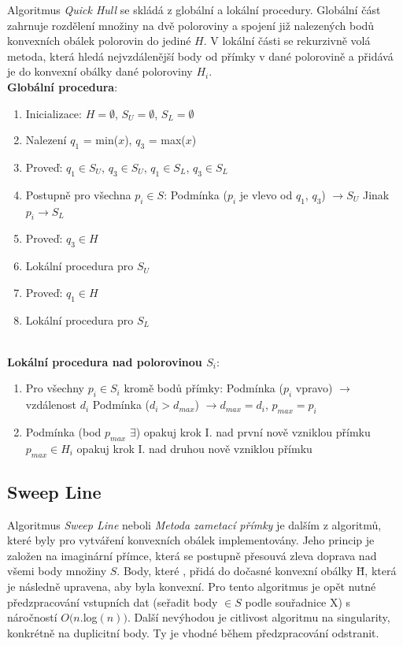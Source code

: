 \documentclass[a4paper, 12pt]{article}
\begin{document}
Algoritmus \textit{Quick Hull} se skládá z globální a lokální procedury. Globální část zahrnuje rozdělení množiny na dvě poloroviny a spojení již nalezených bodů konvexních obálek polorovin do jediné $H$. V lokální části se rekurzivně volá metoda, která hledá nejvzdálenější body od přímky v dané polorovině a přidává je do konvexní obálky dané poloroviny $H_i$.\\

\textbf{Globální procedura}:
\begin{enumerate}
\item Inicializace: $H = \emptyset$, $S_U = \emptyset$, $S_L = \emptyset$ 
\item Nalezení $q_1$ = min($x$), $q_3$ = max($x$)
\item Proveď: $q_1 \in S_U$, $q_3 \in S_U$, $q_1 \in S_L$, $q_3 \in S_L$
\item Postupně pro všechna $p_i \in S$:
\subitem Podmínka ($p_i$ je vlevo od $q_1$, $q_3$) $\rightarrow S_U$
\subitem Jinak $ p_i \rightarrow S_L$
\item Proveď: $q_3 \in H$
\item Lokální procedura pro $S_U$
\item Proveď: $q_1 \in H$
\item Lokální procedura pro $S_L$
\end{enumerate}
~\\
\textbf{Lokální procedura nad polorovinou $S_i$}:
\begin{enumerate}[label=\Roman*.]
\item Pro všechny $p_i \in S_i$ kromě bodů přímky:
\subitem Podmínka ($p_i$ vpravo) $\rightarrow$ vzdálenost $d_i$
\subsubitem Podmínka ($d_i > d_{max}$) $\rightarrow d_{max} = d_i$, $p_{max} = p_i$
\item Podmínka (bod $p_{max}$ $\exists$) 
\subitem opakuj krok I. nad první nově vzniklou přímku
\subitem $p_{max} \in H_i$
\subitem opakuj krok I. nad druhou nově vzniklou přímku
\end{enumerate}

\subsection{Sweep Line}
Algoritmus \textit{Sweep Line} neboli \textit{Metoda zametací přímky} je dalším z algoritmů, které byly pro vytváření konvexních obálek implementovány. Jeho princip je založen na imaginární přímce, která se postupně přesouvá zleva doprava nad všemi body množiny $S$. Body, které , přidá do dočasné konvexní obálky \={H}, která je následně upravena, aby byla konvexní. Pro tento algoritmus je opět nutné předzpracování vstupních dat (seřadit body $\in S$ podle souřadnice X) s náročností $O(n.$log$(n))$. Další nevýhodou je citlivost algoritmu na singularity, konkrétně na duplicitní body. Ty je vhodné během předzpracování odstranit.\\ 
\end{document}
